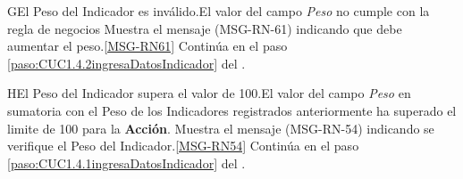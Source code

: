 	\begin{UCtrayectoriaA}{G}{El Peso del Indicador es inválido.}{El valor del campo \textit{Peso} no cumple con la regla de negocios }
			\UCpaso Muestra el mensaje (MSG-RN-61) indicando que debe aumentar el peso.\ref{MSG-RN61}
			\UCpaso Continúa en el paso \ref{paso:CUC1.4.2ingresaDatosIndicador} del .
	\end{UCtrayectoriaA}

	\begin{UCtrayectoriaA}{H}{El Peso del Indicador supera el valor de 100.}{El valor del campo \textit{Peso} en sumatoria con el Peso de los Indicadores registrados anteriormente ha superado el limite de 100 para la \textbf{Acción}.}
			\UCpaso Muestra el mensaje (MSG-RN-54) indicando se verifique el Peso del Indicador.\ref{MSG-RN54}
			\UCpaso Continúa en el paso \ref{paso:CUC1.4.1ingresaDatosIndicador} del .
	\end{UCtrayectoriaA}

